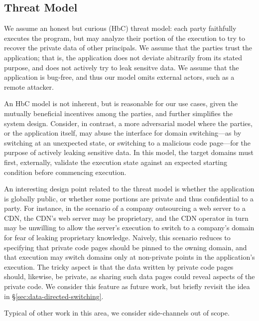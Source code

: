 \subsection{Threat Model}

We assume an honest but curious (HbC) threat model: each party faithfully
executes the program, but may analyze their portion of the execution to try to
recover the private data of other principals.
%
We assume that the parties trust the application; that is, the application does
not deviate abitrarily from its stated purpose, and does not actively try to
leak sensitve data.
%
We assume that the application is bug-free, and thus our model omits external
actors, such as a remote attacker.


An HbC model is not inherent, but is reasonable for our use cases,
given the mutually beneficial incentives among the parties, and further
simplifies the system design.
%
Consider, in contrast, a more adversarial model where the parties, or the
application itself, may abuse the interface for domain switching---as by
switching at an unexpected state, or switching to a malicious code page---for
the purpose of actively leaking sensitive data. 
%
In this model, the target domains must first, externally, validate the
execution state against an expected starting condition before commencing
execution.


An interesting design point related to the threat model is whether the
application is globally public, or whether some portions are private and thus
confidential to a party. 
%
For instance, in the scenario of a company outsourcing a web server to a CDN,
the CDN's web server may be proprietary, and the CDN operator in turn may be
unwilling to allow the server's execution to switch to a company's domain
for fear of leaking proprietary knowledge.
%
Naively, this scenario reduces to specifying that private code pages should be
pinned to the owning domain, and that execution may switch domains only at
non-private points in the application's execution.
%
The tricky aspect is that the data written by private code pages should,
likewise, be private, as sharing such data pages could reveal aspects of
the private code.
%
We consider this feature as future work, but briefly revisit the idea in
\S\ref{sec:data-directed-switching}.


Typical of other work in this area, we consider side-channels out of scope.



